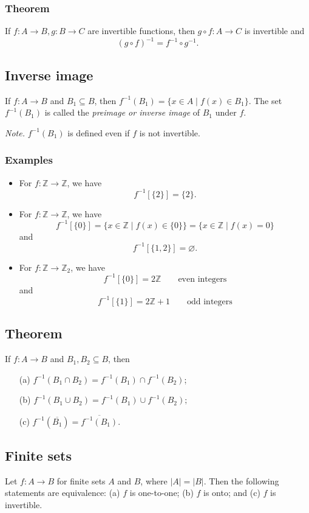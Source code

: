 \documentclass[11pt]{article}
\let\emptyset\varnothing
\begin{document}
    \subsubsection{Theorem}

    If \(f:A \rightarrow B, g:B \rightarrow C\) are invertible functions, then \(g \circ f: A \rightarrow C\) is invertible and \[(g \circ f)^{-1} = f^{-1} \circ g^{-1}.\]

    \subsection{Inverse image}

    If \(f: A \rightarrow B\) and \(B_1 \subseteq B\), then \(f^{-1} (B_1) = \{x \in A \mid f(x) \in B_1\}\). The set \(f^{-1}(B_1)\) is called the \emph{preimage or inverse image} of $B_1$ under $f$.

    \vspace{1em}

    \emph{Note.} \(f^{-1}(B_1)\) is defined even if $f$ is not invertible. 

    \subsubsection{Examples}

    \begin{itemize}
        \item For \(f: \mathbb{Z} \rightarrow \mathbb{Z}\), we have \[f^{-1}[\{2\}] = \{2\}.\]
        \item For \(f: \mathbb{Z} \rightarrow \mathbb{Z}\), we have \[f^{-1}[\{0\}] = \{x \in \mathbb{Z} \mid f(x) \in \{0\}\} = \{x \in \mathbb{Z} \mid f(x) = 0\}\] and \[f^{-1}[\{1,2\}] = \emptyset.\]
        \item For \(f: \mathbb{Z} \rightarrow \mathbb{Z}_2\), we have \[f^{-1}[\{0\}] = 2 \mathbb{Z} \qquad \text{even integers}\] and \[f^{-1}[\{1\}] = 2 \mathbb{Z} + 1 \qquad \text{odd integers}\]
    \end{itemize}

    \subsection{Theorem}

    If \(f: A \rightarrow B\) and \(B_1, B_2 \subseteq B\), then 
    \begin{enumerate}
        \item[(a)] \(f^{-1}(B_1 \cap B_2) = f^{-1}(B_1) \cap f^{-1}(B_2)\);
        \item[(b)] \(f^{-1}(B_1 \cup B_2) = f^{-1}(B_1) \cup f^{-1}(B_2);\)
        \item[(c)] \(f^{-1}(\overline{B_1}) = \overline{f^{-1}(B_1)}\).   
    \end{enumerate}

    \subsection{Finite sets}

    Let \(f: A \rightarrow B\) for finite sets $A$ and $B$, where \(|A| = |B|\). Then the following statements are equivalence: (a) $f$ is one-to-one; (b) $f$ is onto; and (c) $f$ is invertible.
    
\end{document}
